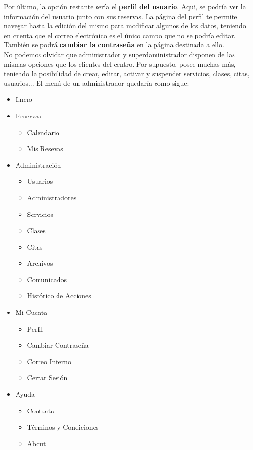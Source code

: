 Por último, la opción restante sería el \textbf{perfil del usuario}. Aquí, se podría ver la información del usuario junto con sus reservas. La página del perfil te permite navegar hasta la edición del mismo para modificar algunos de los datos, teniendo en cuenta que el correo electrónico es el único campo que no se podría editar. También se podrá \textbf{cambiar la contraseña} en la página destinada a ello.\\

No podemos olvidar que administrador y superdaministrador disponen de las mismas opciones que los clientes del centro. Por supuesto, posee muchas más, teniendo la posibilidad de crear, editar, activar y suspender servicios, clases, citas, usuarios... El menú de un administrador quedaría como sigue:

\begin{itemize}
\item Inicio
\item Reservas

\begin{itemize}
\item Calendario
\item Mis Resevas
\end{itemize}

\item Administración

\begin{itemize}
\item Usuarios
\item Administradores
\item Servicios
\item Clases
\item Citas
\item Archivos
\item Comunicados
\item Histórico de Acciones
\end{itemize}

\item Mi Cuenta

\begin{itemize}
\item Perfil
\item Cambiar Contraseña
\item Correo Interno
\item Cerrar Sesión
\end{itemize}

\item Ayuda

\begin{itemize}
\item Contacto
\item Términos y Condiciones
\item About
\end{itemize}

\end{itemize}

